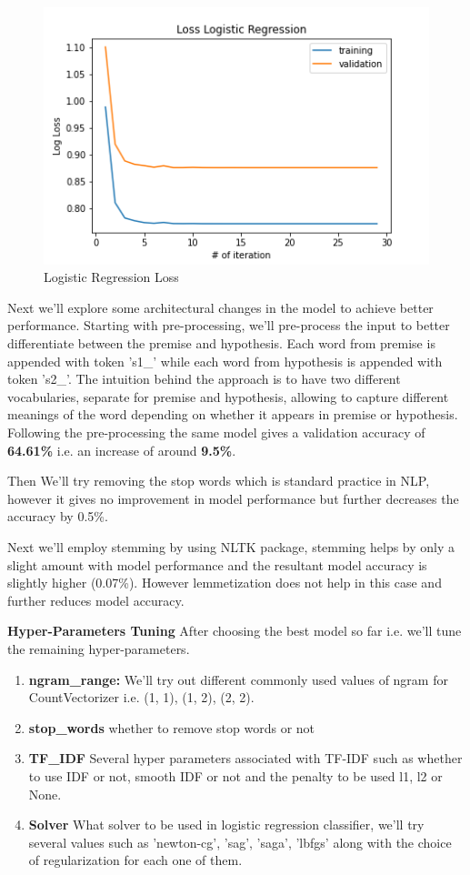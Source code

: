 \documentclass[10pt,a4paper]{article}
\begin{document}
\begin{figure}[h!]
\begin{center}
	\includegraphics[width=0.85\linewidth]{loss_lr.png}
	\caption{Logistic Regression Loss}
	\label{lrloss}
\end{center}
\end{figure}

	Next we'll explore some architectural changes in the model to achieve better performance. Starting with pre-processing, we'll pre-process the input to better differentiate between the premise and hypothesis. Each word from premise is appended with token 's1\_' while each word from hypothesis is appended with token 's2\_'. The intuition behind the approach is to have two different vocabularies, separate for premise and hypothesis, allowing to capture different meanings of the word depending on whether it appears in premise or hypothesis. Following the pre-processing the same model gives a validation accuracy of \textbf{64.61\%} i.e. an increase of around \textbf{9.5\%}.

Then We'll try removing the stop words which is standard practice in NLP, however it gives no improvement in model performance but further decreases the accuracy by 0.5\%. 

Next we'll employ stemming by using NLTK package, stemming helps by only a slight amount with model performance and the resultant model accuracy is slightly higher (0.07\%). However lemmetization does not help in this case and further reduces model accuracy.
 
\textbf{Hyper-Parameters Tuning} After choosing the best model so far i.e. we'll tune the remaining hyper-parameters.
\begin{enumerate}
\item \textbf{ngram\_range:} We'll try out different commonly used values of ngram for CountVectorizer i.e. (1, 1),  (1, 2), (2, 2). 
\item \textbf{stop\_words} whether to remove stop words or not
\item \textbf{TF\_IDF} Several hyper parameters associated with TF-IDF such as whether to use IDF or not, smooth IDF or not and the penalty to be used l1, l2 or None.
\item \textbf{Solver} What solver to be used in logistic regression classifier, we'll try several values such as 'newton-cg', 'sag', 'saga', 'lbfgs' along with the choice of regularization for each one of them.
\end{enumerate}
\end{document}
